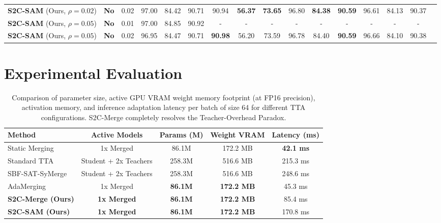 \documentclass{article}
\theoremstyle{plain}
\theoremstyle{definition}
\theoremstyle{remark}
\begin{document}
\begin{table}[t]
\begin{footnotesize}
\begin{sc}
\begin{tabular}{lccccccccccccccc}
\midrule
\textbf{S2C-SAM} (Ours, $\rho{=}0.02$) & \textbf{No} & 0.02 & 97.00 & 84.42 & 90.71 & 90.94 & \textbf{56.37} & \textbf{73.65} & 96.80 & \textbf{84.38} & \textbf{90.59} & 96.61 & 84.13 & 90.37 \\
\textbf{S2C-SAM} (Ours, $\rho{=}0.05$) & \textbf{No} & 0.01 & 97.00 & 84.85 & 90.92 & - & - & - & - & - & - & - & - & - \\
\textbf{S2C-SAM} (Ours, $\rho{=}0.05$) & \textbf{No} & 0.02 & 96.95 & 84.47 & 90.71 & \textbf{90.98} & 56.20 & 73.59 & 96.78 & 84.40 & \textbf{90.59} & 96.66 & 84.10 & 90.38 \\
\bottomrule
\end{tabular}
\end{sc}
\end{footnotesize}
\vskip -0.1in
\end{table}

\section{Experimental Evaluation}
\label{sec:experiments}

\begin{table}[t]
\caption{Comparison of parameter size, active GPU VRAM weight memory footprint (at FP16 precision), activation memory, and inference adaptation latency per batch of size 64 for different TTA configurations. S2C-Merge completely resolves the Teacher-Overhead Paradox.}
\label{tab:memory}
\vskip 0.05in
\centering
\begin{small}
\begin{sc}
\begin{tabular}{lcccc}
\toprule
Method & Active Models & Params (M) & Weight VRAM & Latency (ms) \\
\midrule
Static Merging & 1x Merged & 86.1M & 172.2 MB & \textbf{42.1 ms} \\
\midrule
Standard TTA & Student + 2x Teachers & 258.3M & 516.6 MB & 215.3 ms \\
SBF-SAT-SyMerge & Student + 2x Teachers & 258.3M & 516.6 MB & 248.6 ms \\
\midrule
AdaMerging & 1x Merged & \textbf{86.1M} & \textbf{172.2 MB} & 45.3 ms \\
\textbf{S2C-Merge (Ours)} & \textbf{1x Merged} & \textbf{86.1M} & \textbf{172.2 MB} & 85.4 ms \\
\textbf{S2C-SAM (Ours)} & \textbf{1x Merged} & \textbf{86.1M} & \textbf{172.2 MB} & 170.8 ms \\
\bottomrule
\end{tabular}
\end{sc}
\end{small}
\vskip -0.1in
\end{table}
\end{document}
